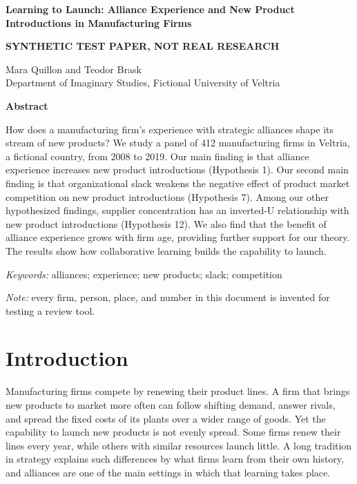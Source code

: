 \documentclass[12pt]{article}
\begin{document}
\thispagestyle{plain}
\begin{center}
{\Large\bfseries Learning to Launch: Alliance Experience and New Product Introductions in Manufacturing Firms\par}
\vspace{0.6em}
{\bfseries SYNTHETIC TEST PAPER, NOT REAL RESEARCH\par}
\vspace{0.6em}
Mara Quillon and Teodor Brask\\
Department of Imaginary Studies, Fictional University of Veltria
\end{center}

\begin{center}\bfseries Abstract\end{center}
\noindent How does a manufacturing firm's experience with strategic alliances shape its stream of new products? We study a panel of 412 manufacturing firms in Veltria, a fictional country, from 2008 to 2019. Our main finding is that alliance experience increases new product introductions (Hypothesis 1). Our second main finding is that organizational slack weakens the negative effect of product market competition on new product introductions (Hypothesis 7). Among our other hypothesized findings, supplier concentration has an inverted-U relationship with new product introductions (Hypothesis 12). We also find that the benefit of alliance experience grows with firm age, providing further support for our theory. The results show how collaborative learning builds the capability to launch.

\medskip
\noindent\textit{Keywords:} alliances; experience; new products; slack; competition

\noindent\textit{Note:} every firm, person, place, and number in this document is invented for testing a review tool.

\clearpage

\section{Introduction}

Manufacturing firms compete by renewing their product lines. A firm that brings new products to market more often can follow shifting demand, answer rivals, and spread the fixed costs of its plants over a wider range of goods. Yet the capability to launch new products is not evenly spread. Some firms renew their lines every year, while others with similar resources launch little. A long tradition in strategy explains such differences by what firms learn from their own history, and alliances are one of the main settings in which that learning takes place.
\end{document}
